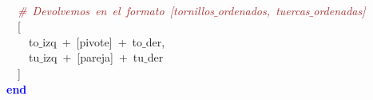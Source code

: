 \mbox{} \\
\mbox{}\ \ \textit{\textcolor{Brown}{\#\ Devolvemos\ en\ el\ formato\ [tornillos$\_$ordenados,\ tuercas$\_$ordenadas]}} \\
\mbox{}\ \ \textcolor{BrickRed}{[} \\
\mbox{}\ \ \ \ to$\_$izq\ \textcolor{BrickRed}{+}\ \textcolor{BrickRed}{[}pivote\textcolor{BrickRed}{]}\ \textcolor{BrickRed}{+}\ to$\_$der\textcolor{BrickRed}{,} \\
\mbox{}\ \ \ \ tu$\_$izq\ \textcolor{BrickRed}{+}\ \textcolor{BrickRed}{[}pareja\textcolor{BrickRed}{]}\ \textcolor{BrickRed}{+}\ tu$\_$der \\
\mbox{}\ \ \textcolor{BrickRed}{]} \\
\mbox{}\textbf{\textcolor{Blue}{end}} \\
\mbox{}